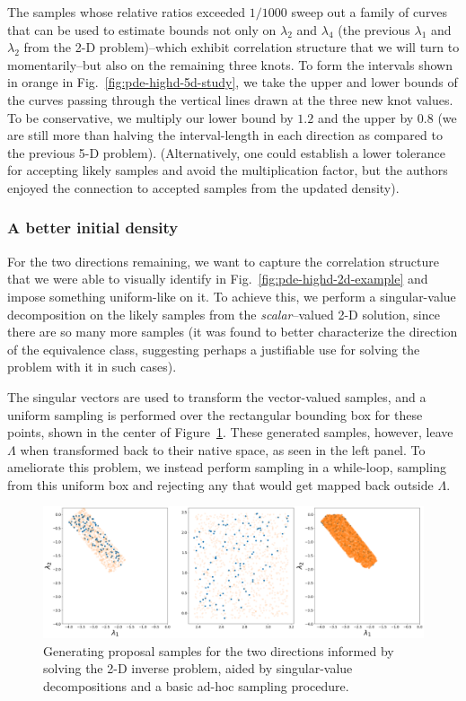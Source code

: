 The samples whose relative ratios exceeded $1/1000$ sweep out a family of curves that can be used to estimate bounds not only on $\lambda_2$ and $\lambda_4$ (the previous $\lambda_1$ and $\lambda_2$ from the 2-D problem)\---which exhibit correlation structure that we will turn to momentarily\---but also on the remaining three knots.
To form the intervals shown in orange in Fig.~\ref{fig:pde-highd-5d-study}, we take the upper and lower bounds of the curves passing through the vertical lines drawn at the three new knot values.
To be conservative, we multiply our lower bound by $1.2$ and the upper by $0.8$ (we are still more than halving the interval-length in each direction as compared to the previous 5-D problem).
(Alternatively, one could establish a lower tolerance for accepting likely samples and avoid the multiplication factor, but the authors enjoyed the connection to accepted samples from the updated density).

\subsubsection{A better initial density}
For the two directions remaining, we want to capture the correlation structure that we were able to visually identify in Fig.~\ref{fig:pde-highd-2d-example} and impose something uniform-like on it.
To achieve this, we perform a singular-value decomposition on the likely samples from the \emph{scalar}--valued 2-D solution, since there are so many more samples (it was found to better characterize the direction of the equivalence class, suggesting perhaps a justifiable use for solving the problem with it in such cases).

The singular vectors are used to transform the vector-valued samples, and a uniform sampling is performed over the rectangular bounding box for these points, shown in the center of Figure~\ref{fig:pde-highd-2d-study}.
These generated samples, however, leave $\Lambda$ when transformed back to their native space, as seen in the left panel.
To ameliorate this problem, we instead perform sampling in a while-loop, sampling from this uniform box and rejecting any that would get mapped back outside $\Lambda$.


\begin{figure}[htbp]
\centering
  \includegraphics[width=0.95\linewidth]{figures/pde-highd/pde-highd-alt_initial_D2_m100}
\caption{
Generating proposal samples for the two directions informed by solving the 2-D inverse problem, aided by singular-value decompositions and a basic ad-hoc sampling procedure.
}
\label{fig:pde-highd-2d-study}
\end{figure}

